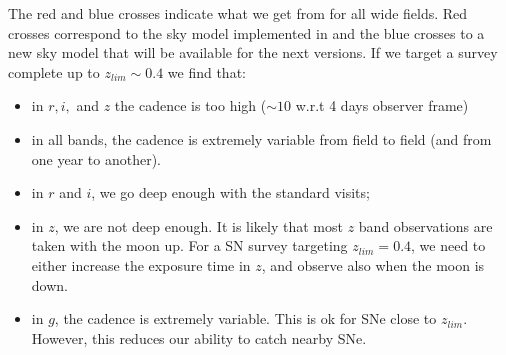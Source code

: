 \documentclass[\docopts]{\docclass}
\begin{document}
The red and blue crosses indicate what we get from 
for all  wide fields. Red crosses correspond to the sky model implemented in
 \cite{1991PASP..103.1033K} and the blue crosses to
a new sky model that will be available for the next  versions.  If we target a survey complete up to $z_{lim} \sim 0.4$
we find that:
\begin{itemize}
  \item in $r, i, $ and $z$ the cadence is too high ($\sim 10$ w.r.t 4 days observer frame)
  \item in all bands, the cadence is extremely variable from field to
    field (and from one year to another).
  \item in $r$ and $i$, we go deep enough with the standard visits;
  \item in $z$, we are not deep enough. It is likely that most $z$
    band observations are taken with the moon up. For a SN survey targeting 
    $z_{lim} = 0.4$, we need to either increase the exposure time in $z$, and 
    observe also when the moon is down.    
  \item in $g$, the cadence is extremely variable. This is ok for SNe
    close to $z_{lim}$.  However, this reduces our ability to catch
    nearby SNe.
\end{itemize}
\end{document}
